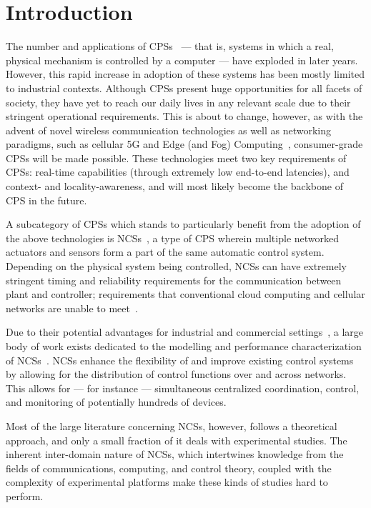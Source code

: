 \section{Introduction}\label{sec:intro}

The number and applications of \acp{CPS}~\cite{Rajkumar2010CPS} --- that is, systems in which a real, physical mechanism is controlled by a computer --- have exploded in later years.
However, this rapid increase in adoption of these systems has been mostly limited to industrial contexts.
Although \acp{CPS} present huge opportunities for all facets of society, they have yet to reach our daily lives in any relevant scale due to their stringent operational requirements.
This is about to change, however, as with the advent of novel wireless communication technologies as well as networking paradigms, such as cellular 5G and Edge (and Fog) Computing~\cite{Satya2009Case,Satya2017Emergence}, consumer-grade \acp{CPS} will be made possible.
These technologies meet two key requirements of \acp{CPS}: real-time capabilities (through extremely low end-to-end latencies), and context- and locality-awareness, and will most likely become the backbone of \ac{CPS} in the future.

A subcategory of \acp{CPS} which stands to particularly benefit from the adoption of the above technologies is \acp{NCS}~\cite{Gupta2010NCSOverview}, a type of \ac{CPS} wherein multiple networked actuators and sensors form a part of the same automatic control system.
Depending on the physical system being controlled, \acp{NCS} can have extremely stringent timing and reliability requirements for the communication between plant and controller; requirements that conventional cloud computing and cellular networks are unable to meet~\cite{Liu2017Review,Wan2020Efficient}.

Due to their potential advantages for industrial and commercial settings~\cite{Lu2015WSAN}, a large body of work exists dedicated to the modelling and performance characterization of \aclp{NCS}~\cite{Hespanha2007Survey,Zhang2013Survey,Zhang2016Survey}.
\Acp{NCS} enhance the flexibility of and improve existing control systems by allowing for the distribution of control functions over and across networks.
This allows for --- for instance --- simultaneous centralized coordination, control, and monitoring of potentially hundreds of devices.

Most of the large literature concerning \acp{NCS}, however, follows a theoretical approach, and only a small fraction of it deals with experimental studies.
The inherent inter-domain nature of \acp{NCS}, which intertwines knowledge from the fields of communications, computing, and control theory, coupled with the complexity of experimental platforms make these kinds of studies hard to perform.

